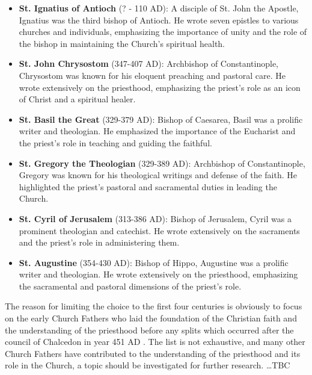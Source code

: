 \documentclass[12pt, doc]{apa7}   	%
\begin{document}
\begin{itemize}
    \item \textbf{St. Ignatius of Antioch} (? - 110 AD): A disciple of St. John the Apostle, Ignatius was the third bishop of Antioch. He wrote seven epistles to various churches and individuals, emphasizing the importance of unity and the role of the bishop in maintaining the Church’s spiritual health.
    \item \textbf{St. John Chrysostom} (347-407 AD): Archbishop of Constantinople, Chrysostom was known for his eloquent preaching and pastoral care. He wrote extensively on the priesthood, emphasizing the priest’s role as an icon of Christ and a spiritual healer.
    \item \textbf{St. Basil the Great} (329-379 AD): Bishop of Caesarea, Basil was a prolific writer and theologian. He emphasized the importance of the Eucharist and the priest’s role in teaching and guiding the faithful.
    \item \textbf{St. Gregory the Theologian} (329-389 AD): Archbishop of Constantinople, Gregory was known for his theological writings and defense of the faith. He highlighted the priest’s pastoral and sacramental duties in leading the Church.
    \item \textbf{St. Cyril of Jerusalem} (313-386 AD): Bishop of Jerusalem, Cyril was a prominent theologian and catechist. He wrote extensively on the sacraments and the priest’s role in administering them.
    \item \textbf{St. Augustine} (354-430 AD): Bishop of Hippo, Augustine was a prolific writer and theologian. He wrote extensively on the priesthood, emphasizing the sacramental and pastoral dimensions of the priest’s role.
\end{itemize}
    

The reason for limiting the choice to the first four centuries is obviously to focus on the early Church Fathers who laid the foundation of the Christian faith and the understanding of the priesthood before any splits which occurred after the  council of Chalcedon in year 451 AD \citep{early_church_akin}.  The list is not exhaustive, and many other Church Fathers have contributed to the understanding of the priesthood and its role in the Church, a topic should be investigated for further research. \dots TBC
\end{document}

